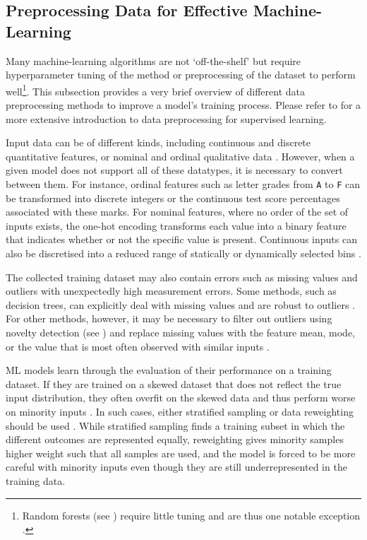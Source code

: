 \subsection{Preprocessing Data for Effective Machine-Learning} \label{txt:data-preprocessing}

Many machine-learning algorithms are not `off-the-shelf' but require hyperparameter tuning of the method or preprocessing of the dataset \cite{statistical-learning-2009} to perform well\footnote{Random forests (see ) require little tuning and are thus one notable exception \cite{ml-hyperparameters-2021}.}. This subsection provides a very brief overview of different data preprocessing methods to improve a model's training process. Please refer to \textcite{data-preprocessing-2007} for a more extensive introduction to data preprocessing for supervised learning.

\newpar Input data can be of different kinds, including continuous and discrete quantitative features, or nominal and ordinal qualitative data \cite{feature-selection-2014}. However, when a given model does not support all of these datatypes, it is necessary to convert between them. For instance, ordinal features such as letter grades from \texttt{A} to \texttt{F} can be transformed into discrete integers or the continuous test score percentages associated with these marks. For nominal features, where no order of the set of inputs exists, the one-hot encoding transforms each value into a binary feature that indicates whether or not the specific value is present. Continuous inputs can also be discretised into a reduced range of statically or dynamically selected bins \cite{data-preprocessing-2007}.

The collected training dataset may also contain errors such as missing values and outliers with unexpectedly high measurement errors. Some methods, such as decision trees, can explicitly deal with missing values \cite{machine-learning-1997} and are robust to outliers \cite{statistical-learning-2009}. For other methods, however, it may be necessary to filter out outliers using novelty detection (see ) and replace missing values with the feature mean, mode, or the value that is most often observed with similar inputs \cite{data-preprocessing-2007}.

ML models learn through the evaluation of their performance on a training dataset. If they are trained on a skewed dataset that does not reflect the true input distribution, they often overfit on the skewed data and thus perform worse on minority inputs \cite{ml-bias-discrimination-2017}. In such cases, either stratified sampling or data reweighting should be used \cite{data-preprocessing-2007}. While stratified sampling finds a training subset in which the different outcomes are represented equally, reweighting gives minority samples higher weight such that all samples are used, and the model is forced to be more careful with minority inputs even though they are still underrepresented in the training data.

